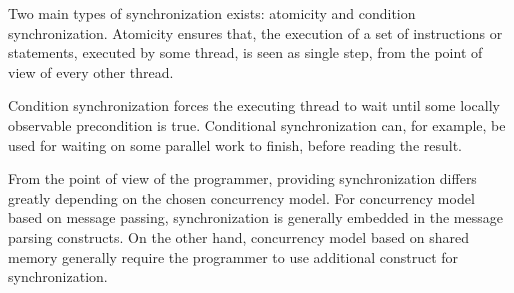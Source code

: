 Two main types of synchronization exists: atomicity and condition synchronization. Atomicity ensures that, the execution of a set of instructions or statements, executed by some thread, is seen as single step, from the point of view of every other thread\cite[p. 1989]{scott2011sync}.

Condition synchronization forces the executing thread to wait until some locally observable precondition is true\cite[p. 1989]{scott2011sync}. Conditional synchronization can, for example, be used for waiting on some parallel work to finish, before reading the result.

From the point of view of the programmer, providing synchronization differs greatly depending on the chosen concurrency model. For concurrency model based on message passing, synchronization is generally embedded in the message parsing constructs. On the other hand, concurrency model based on shared memory generally require the programmer to use additional construct for synchronization\cite[p. 1989]{scott2011sync}.

\worksheetend
